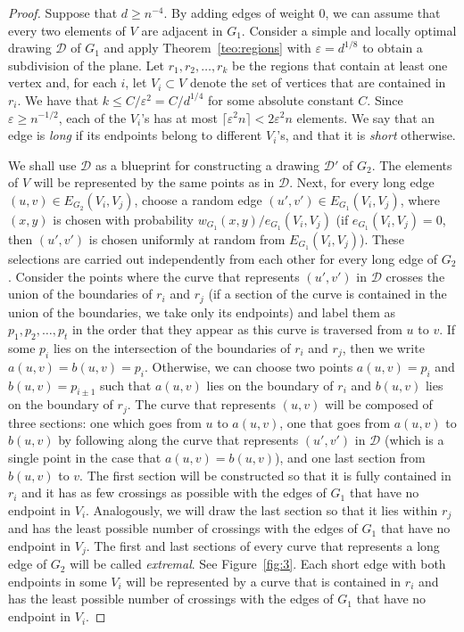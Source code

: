 \documentclass{article}
\begin{document}
\begin{proof}
    
    
    Suppose that $d\geq n^{-4}$. By adding edges of weight $0$, we can assume that every two elements of $V$ are adjacent in $G_1$. Consider a simple and locally optimal drawing $\mathcal{D}$ of $G_1$ and apply Theorem~\ref{teo:regions} with $\varepsilon=d^{1/8}$ to obtain a subdivision of the plane. Let $r_1,r_2,\dots,r_k$ be the regions that contain at least one vertex and, for each $i$, let $V_i\subset V$ denote the set of vertices that are contained in $r_i$. We have that $k\leq C /\varepsilon^2=C/d^{1/4}$ for some absolute constant $C$. Since $\varepsilon\geq n^{-1/2}$, each of the $V_i$'s has at most $\lceil\varepsilon^2 n\rceil<2\varepsilon^2 n$ elements. We say that an edge is \textit{long} if its endpoints belong to different $V_i$'s, and that it is \textit{short} otherwise.
    
    We shall use $\mathcal{D}$ as a blueprint for constructing a drawing $\mathcal{D}'$ of $G_2$. The elements of $V$ will be represented by the same points as in $\mathcal{D}$. Next, for every long edge $(u,v)\in E_{G_2}(V_i,V_j)$, choose a random edge $(u',v')\in E_{G_1}(V_i,V_j)$, where $(x,y)$ is chosen with probability $w_{G_1}(x,y)/e_{G_1}(V_i,V_j)$ (if $e_{G_1}(V_i,V_j)=0$, then $(u',v')$ is chosen uniformly at random from $E_{G_1}(V_i,V_j)$). These selections are carried out independently from each other for every long edge of $G_2$. Consider the points where the curve that represents $(u',v')$ in $\mathcal{D}$ crosses the union of the boundaries of $r_i$ and $r_j$ (if a section of the curve is contained in the union of the boundaries, we take only its endpoints) and label them as $p_1,p_2,\dots,p_t$ in the order that they appear as this curve is traversed from $u$ to $v$. If some $p_i$ lies on the intersection of the boundaries of $r_i$ and $r_j$, then we write $a(u,v)=b(u,v)=p_i$. Otherwise, we can choose two points $a(u,v)=p_i$ and $b(u,v)=p_{i\pm 1}$ such that $a(u,v)$ lies on the boundary of $r_i$ and $b(u,v)$ lies on the boundary of $r_j$. The curve that represents $(u,v)$ will be composed of three sections: one which goes from $u$ to $a(u,v)$, one that goes from $a(u,v)$ to $b(u,v)$ by following along the curve that represents $(u',v')$ in $\mathcal{D}$ (which is a single point in the case that $a(u,v)=b(u,v)$), and one last section from $b(u,v)$ to $v$. The first section will be constructed so that it is fully contained in $r_i$ and it has as few crossings as possible with the edges of $G_1$ that have no endpoint in $V_i$. Analogously, we will draw the last section so that it lies within $r_j$ and has the least possible number of crossings with the edges of $G_1$ that have no endpoint in $V_j$. The first and last sections of every curve that represents a long edge of $G_2$ will be called \textit{extremal}. See Figure~\ref{fig:3}. Each short edge with both endpoints in some $V_i$ will be represented by a curve that is contained in $r_i$ and has the least possible number of crossings with the edges of $G_1$ that have no endpoint in $V_i$. 


\end{proof}
\end{document}
